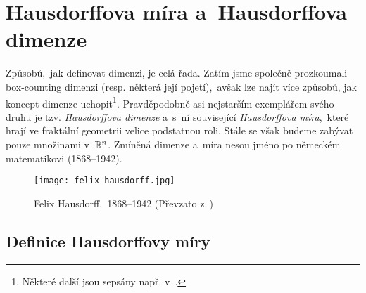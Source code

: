 \section{Hausdorffova míra a~Hausdorffova dimenze}\label{sec:hausdorffova-mira-dimenze}

Způsobů,~jak definovat dimenzi, je celá řada. Zatím jsme společně prozkoumali box-counting dimenzi (resp. některá její pojetí),~avšak lze najít více způsobů, jak koncept dimenze uchopit\footnote{Některé další jsou sepsány např. v~\citep[str. 40]{Falconer2014}.}. Pravděpodobně asi nejstarším exemplářem svého druhu je tzv. \emph{Hausdorffova dimenze} a~s~ní související \emph{Hausdorffova míra},~které hrají ve fraktální geometrii velice podstatnou roli. Stále se však budeme zabývat pouze množinami v~$\mathbb{R}^n$. Zmíněná dimenze a~míra nesou jméno po německém matematikovi  (1868--1942).
\begin{figure}[h]
    \centering
    \texttt{[image: felix-hausdorff.jpg]}
    \caption[Felix Hausdorff,~1868--1942]{Felix Hausdorff,~1868--1942 (Převzato z~\cite{OConnorHausdorff2025})}
    \label{fig:felix-hausdorff}
\end{figure}

\subsection{Definice Hausdorffovy míry}\label{subsec:hd-mira-definice}

